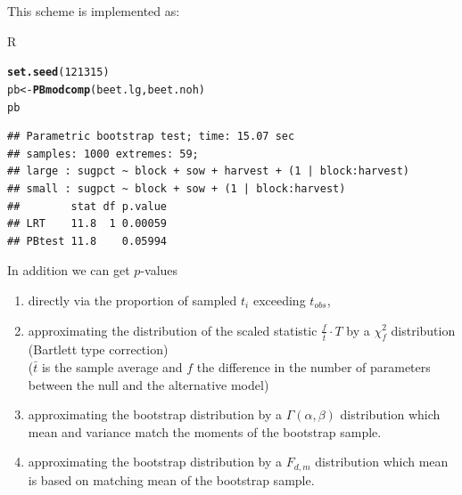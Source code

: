 \documentclass[compress]{beamer}\usepackage[]{graphicx}\usepackage[]{color}
\makeatletter
\newcommand{\hlnum}[1]{\textcolor[rgb]{0.686,0.059,0.569}{#1}}%
\newcommand{\hlstd}[1]{\textcolor[rgb]{0.345,0.345,0.345}{#1}}%
\newcommand{\hlkwb}[1]{\textcolor[rgb]{0.69,0.353,0.396}{#1}}%
\newcommand{\hlkwd}[1]{\textcolor[rgb]{0.737,0.353,0.396}{\textbf{#1}}}%
\newenvironment{kframe}{%
 \def\at@end@of@kframe{}%
 \ifinner\ifhmode%
  \def\at@end@of@kframe{\end{minipage}}%
  \begin{minipage}{\columnwidth}%
 \fi\fi%
 \def\FrameCommand##1{\hskip\@totalleftmargin \hskip-\fboxsep
 \colorbox{shadecolor}{##1}\hskip-\fboxsep
     \hskip-\linewidth \hskip-\@totalleftmargin \hskip\columnwidth}%
 \MakeFramed {\advance\hsize-\width
   \@totalleftmargin\z@ \linewidth\hsize
   \@setminipage}}%
 {\par\unskip\endMakeFramed%
 \at@end@of@kframe}
\newenvironment{knitrout}{}{} %
\newenvironment{sframe}
{\begin{frame} [containsverbatim] }
  {\end{frame}}
\newenvironment{sblock}
{\begin{block}{R}}
  {\end{block}}
\makeatother
\begin{document}
\begin{sframe}

  This scheme is implemented as:

\begin{sblock}
\begin{knitrout}\scriptsize
{}\color{fgcolor}\begin{kframe}
\begin{alltt}
\hlkwd{set.seed}\hlstd{(}\hlnum{121315}\hlstd{)}
\hlstd{pb} \hlkwb{<-} \hlkwd{PBmodcomp}\hlstd{(beet.lg, beet.noh)}
\hlstd{pb}
\end{alltt}
\begin{verbatim}
## Parametric bootstrap test; time: 15.07 sec
## samples: 1000 extremes: 59;
## large : sugpct ~ block + sow + harvest + (1 | block:harvest)
## small : sugpct ~ block + sow + (1 | block:harvest)
##        stat df p.value
## LRT    11.8  1 0.00059
## PBtest 11.8    0.05994
\end{verbatim}
\end{kframe}
\end{knitrout}
\end{sblock}  
\end{sframe}

\begin{sframe}

In addition we can get $p$-values
  
  \begin{enumerate}
\item
directly via the proportion of sampled $t_i$ exceeding $t_{obs}$, 
\item
  approximating the distribution of the scaled statistic $\frac{f}{\bar t}\cdot T$ by
  a  $\chi^2_f$ distribution (Bartlett type correction)\\
  ($\bar t$ is the sample average  and $f$ the difference in the number of parameters
  between the null and the alternative model)  
\item
  approximating the bootstrap distribution by a $\Gamma(\alpha,\beta)$ distribution
  which mean and variance match the moments of the bootstrap sample.
\item 
  approximating the bootstrap distribution by a $F_{d,m}$ distribution
  which mean is based on matching mean of  the bootstrap sample.
\end{enumerate}

\end{sframe}
\end{document}
